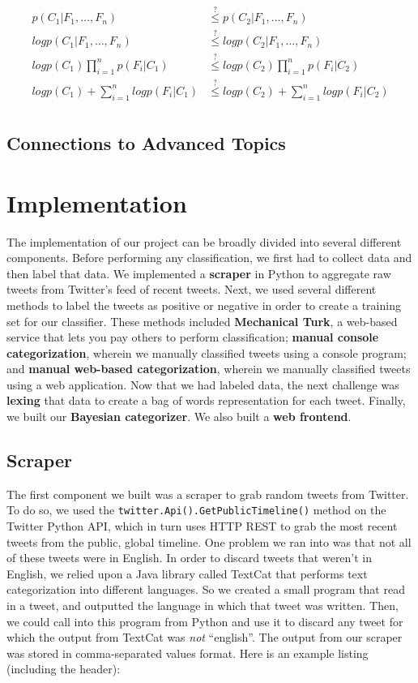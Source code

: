 \documentclass[12pt,a4paper]{article}
\begin{document}
\begin{align*}
p(C_1 \vert F_1,\dots,F_n) & \stackrel{\text{?}}{\leq} p(C_2 \vert F_1,\dots,F_n) \\
log p(C_1 \vert F_1,\dots,F_n) & \stackrel{\text{?}}{\leq} log p(C_2 \vert F_1,\dots,F_n) \\
log p(C_1) \prod_{i=1}^n p(F_i \vert C_1) & \stackrel{\text{?}}{\leq} log p(C_2) \prod_{i=1}^n p(F_i \vert C_2) \\
log p(C_1) + \sum_{i=1}^n log p(F_i \vert C_1) & \stackrel{\text{?}}{\leq} log p(C_2) + \sum_{i=1}^n log p(F_i \vert C_2) \\
\end{align*}

\subsection { Connections to Advanced Topics }

\section{ Implementation }

The implementation of our project can be broadly divided into several different components. Before performing any classification, we first had to collect data and then label that data. We implemented a \textbf{scraper} in Python to aggregate raw tweets from Twitter's feed of recent tweets. Next, we used several different methods to label the tweets as positive or negative in order to create a training set for our classifier. These methods included \textbf{Mechanical Turk}, a web-based service that lets you pay others to perform classification; \textbf{manual console categorization}, wherein we manually classified tweets using a console program; and \textbf{manual web-based categorization}, wherein we manually classified tweets using a web application. Now that we had labeled data, the next challenge was \textbf{lexing} that data to create a bag of words representation for each tweet. Finally, we built our \textbf{Bayesian categorizer}. We also built a \textbf{web frontend}.

\subsection { Scraper }

The first component we built was a scraper to grab random tweets from Twitter. To do so, we used the \texttt{twitter.Api().GetPublicTimeline()} method on the Twitter Python API, which in turn uses HTTP REST to grab the most recent tweets from the public, global timeline. One problem we ran into was that not all of these tweets were in English. In order to discard tweets that weren't in English, we relied upon a Java library called TextCat that performs text categorization into different languages. So we created a small program that read in a tweet, and outputted the language in which that tweet was written. Then, we could call into this program from Python and use it to discard any tweet for which the output from TextCat was \emph{not} ``english''. The output from our scraper was stored in comma-separated values format. Here is an example listing (including the header):
\end{document}
